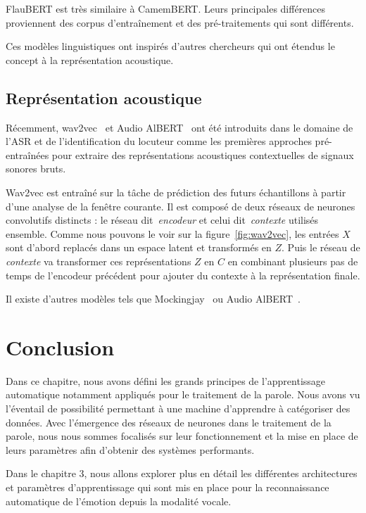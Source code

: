 FlauBERT est très similaire à CamemBERT. Leurs principales différences proviennent des corpus d’entraînement et des pré-traitements qui sont différents. %

Ces modèles linguistiques ont inspirés d'autres chercheurs qui ont étendus le concept à la représentation acoustique.

\subsection{Représentation acoustique}
Récemment, wav2vec~\cite{Schneider2019} et Audio AlBERT~\cite{Chi2020} ont été introduits dans le domaine de l'ASR et de l'identification du locuteur comme les premières approches pré-entraînées pour extraire des représentations acoustiques contextuelles de signaux sonores bruts.



Wav2vec est entraîné sur la tâche de prédiction des futurs échantillons à partir d'une analyse de la fenêtre courante. Il est composé de deux réseaux de neurones convolutifs distincts : le réseau dit~\textit{encodeur} et celui dit~\textit{contexte} utilisés ensemble. Comme nous pouvons le voir sur la figure~\ref{fig:wav2vec}, les entrées $X$ sont d'abord replacés dans un espace latent et transformés en $Z$. Puis le réseau de \textit{contexte} va transformer ces représentations $Z$ en $C$ en combinant plusieurs pas de temps de l'encodeur précédent pour ajouter du contexte à la représentation finale.

Il existe d'autres modèles tels que Mockingjay~\cite{Liu2020} ou Audio AlBERT~\cite{Chi2020}.

\section{Conclusion}
Dans ce chapitre, nous avons défini les grands principes de l'apprentissage automatique notamment appliqués pour le traitement de la parole. Nous avons vu l'éventail de possibilité permettant à une machine d'apprendre à catégoriser des données. Avec l'émergence des réseaux de neurones dans le traitement de la parole, nous nous sommes focalisés sur leur fonctionnement et la mise en place de leurs paramètres afin d'obtenir des systèmes performants.

Dans le chapitre 3, nous allons explorer plus en détail les différentes architectures et paramètres d'apprentissage qui sont mis en place pour la reconnaissance automatique de l'émotion depuis la modalité vocale.
